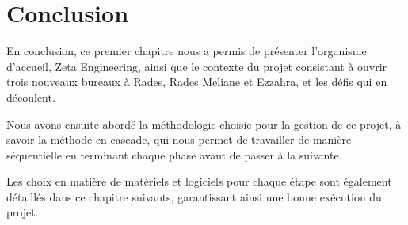 \section{Conclusion }
En conclusion, ce premier chapitre nous a permis de présenter l'organisme d'accueil, Zeta Engineering, ainsi que le contexte du projet consistant à ouvrir trois nouveaux bureaux à Rades, Rades Meliane et Ezzahra, et les défis qui en découlent.

Nous avons ensuite abordé la méthodologie choisie pour la gestion de ce projet, à savoir la méthode en cascade, qui nous permet de travailler de manière séquentielle en terminant chaque phase avant de passer à la suivante.

Les choix en matière de matériels et logiciels pour chaque étape sont également détaillés dans ce chapitre suivants, garantissant ainsi une bonne exécution du projet.